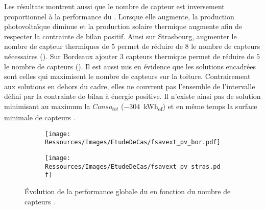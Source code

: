 Les résultats montrent aussi que le nombre de capteur  est inversement
proportionnel à la performance du . Lorsque elle augmente, la production
photovoltaïque diminue et la production solaire thermique augmente afin de respecter la
contrainte de bilan positif. Ainsi sur Strasbourg, augmenter le nombre de capteur
thermiques de $5$ permet de réduire de $8$ le nombre de capteurs  nécessaires
(). Sur Bordeaux ajouter $3$ capteurs thermique permet
de réduire de $5$ le nombre de capteurs  (). Il est aussi
mis en évidence que les solutions encadrées sont celles qui maximisent le nombre de
capteurs  sur la toiture. Contrairement aux solutions en dehors du cadre, elles ne
couvrent pas l’ensemble de l’intervalle défini par la contrainte de bilan à énergie
positive. Il n’existe ainsi pas de solution minimisant au maximum la $Conso_{tot}$
(\SI{-304}{kWh_{ef}}) et en même temps la surface minimale de capteurs .

\begin{figure}
    \centering
    \begin{subfigure}[b]{0.48\textwidth}
        \centering
        \texttt{[image: Ressources/Images/EtudeDeCas/fsavext\_pv\_bor.pdf]}
        \caption{}
        \label{fig:fsav_pv_bor}
    \end{subfigure}
    \quad
    \begin{subfigure}[b]{0.48\textwidth}
        \centering
        \texttt{[image: Ressources/Images/EtudeDeCas/fsavext\_pv\_stras.pdf]}
        \caption{}
        \label{fig:fsav_pv_stras}
    \end{subfigure}
    \caption[Évolution de la performance globale du  en fonction du nombre de capteurs .]
             {Évolution de la performance globale du  en fonction du nombre de capteurs .}
    \label{fig:fsav_pv_bor_stras}
\end{figure}



